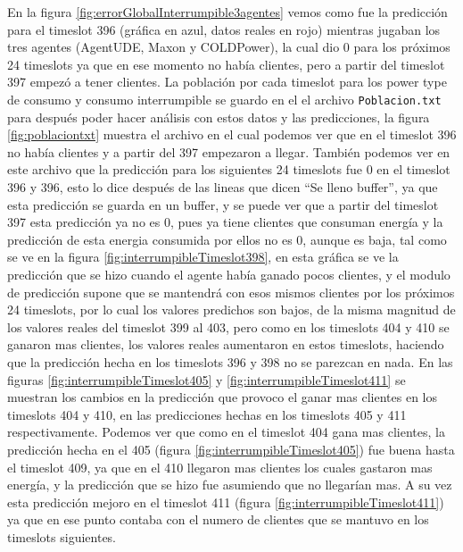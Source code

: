En la figura \ref{fig:errorGlobalInterrumpible3agentes} vemos como fue la predicción para el timeslot 396 (gráfica en azul, datos reales en rojo) mientras jugaban los tres agentes (AgentUDE, Maxon y COLDPower), la cual dio 0 para los próximos 24 timeslots ya que en ese momento no había clientes, pero a partir del timeslot 397 empezó a tener clientes. 
La población por cada timeslot para los power type de consumo y consumo interrumpible se guardo en el el archivo \texttt{Poblacion.txt} para después poder hacer análisis con estos datos y las predicciones, la figura \ref{fig:poblaciontxt} muestra el archivo en el cual podemos ver que en el timeslot 396 no había clientes y a partir del 397 empezaron a llegar.
También podemos ver en este archivo que la predicción para los siguientes 24 timeslots fue 0 en el timeslot 396 y 396, esto lo dice después de las lineas que dicen ``Se lleno buffer'', ya que esta predicción se guarda en un buffer, y se puede ver que a partir del timeslot 397 esta predicción ya no es 0, pues ya tiene clientes que consuman energía y la predicción de esta energia consumida por ellos no es 0, aunque es baja, tal como se ve en la figura \ref{fig:interrumpibleTimeslot398}, en esta gráfica se ve la predicción que se hizo cuando el agente había ganado pocos clientes, y el modulo de predicción supone que se mantendrá con esos mismos clientes por los próximos 24 timeslots, por lo cual los valores predichos son bajos, de la misma magnitud de los valores reales del timeslot 399 al 403, pero como en los timeslots 404 y 410 se ganaron mas clientes, los valores reales aumentaron en estos timeslots, haciendo que la predicción hecha en los timeslots 396 y 398 no se parezcan en nada.
En las figuras \ref{fig:interrumpibleTimeslot405} y \ref{fig:interrumpibleTimeslot411} se muestran los cambios en la predicción que provoco el ganar mas clientes en los timeslots 404 y 410, en las predicciones hechas en los timeslots 405 y 411 respectivamente. 
Podemos ver que como en el timeslot 404 gana mas clientes, la predicción hecha en el 405 (figura \ref{fig:interrumpibleTimeslot405}) fue buena hasta el timeslot 409, ya que en el 410 llegaron mas clientes los cuales gastaron mas energía, y la predicción que se hizo fue asumiendo que no llegarían mas. 
A su vez esta predicción mejoro en el timeslot 411 (figura \ref{fig:interrumpibleTimeslot411}) ya que en ese punto contaba con el numero de clientes que se mantuvo en los timeslots siguientes.

